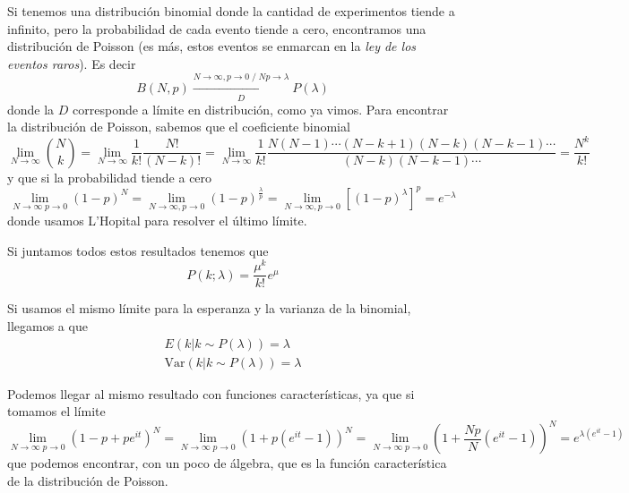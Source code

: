\documentclass{article}
\numberwithin{equation}{section} %
\begin{document}
Si tenemos una distribución binomial donde la cantidad de experimentos tiende a infinito, pero la probabilidad de cada evento tiende a cero, encontramos una distribución de Poisson (es más, estos eventos se enmarcan en la \emph{ley de los eventos raros}). Es decir
\begin{equation}
B(N, p) \xrightarrow[D]{N \to \infty, p \to 0 \; / \; N p \to \lambda} P(\lambda)
\end{equation}
donde la $D$ corresponde a límite en distribución, como ya vimos. Para encontrar la distribución de Poisson, sabemos que el coeficiente binomial
\begin{equation}
\lim_{N\to\infty} \binom{N}{k} = \lim_{N\to\infty} \frac{1}{k!} \frac{N!}{(N - k)!} = \lim_{N\to\infty} \frac{1}{k!} \frac{N (N - 1) \cdots (N - k + 1) (N - k) (N - k - 1) \cdots}{(N - k) (N - k - 1) \cdots } = \frac{N^k}{k!}
\end{equation}
y que si la probabilidad tiende a cero
\begin{equation}
\lim_{N\to\infty\;p \to 0} (1 - p)^{N} = \lim_{N\to\infty, p \to 0} (1 - p)^{\frac{\lambda}{p}} = \lim_{N\to\infty, p \to 0} \left[(1 - p)^{\lambda}\right]^{p} = e^{-\lambda}
\end{equation}
donde usamos L'Hopital para resolver el último límite.

Si juntamos todos estos resultados tenemos que
\begin{equation}
P(k;\lambda) = \frac{\mu^{k}}{k!} e^{\mu}
\end{equation}

Si usamos el mismo límite para la esperanza y la varianza de la binomial, llegamos a que
\begin{equation}
\begin{gathered}
E(k|k \sim P(\lambda)) = \lambda \\
\text{Var}(k|k\sim P(\lambda)) = \lambda
\end{gathered}
\end{equation}

Podemos llegar al mismo resultado con funciones características, ya que si tomamos el límite
\begin{equation}
\lim_{N\to\infty\;p\to 0} (1 - p + p e^{it})^N = \lim_{N\to\infty\;p\to 0} (1 + p ( e^{it} - 1))^N = \lim_{N\to\infty\;p\to 0} \left(1 + \frac{N p}{N} (e^{it} - 1 )\right)^N = e^{\lambda (e^{it} - 1)}
\end{equation} 
que podemos encontrar, con un poco de álgebra, que es la función característica de la distribución de Poisson.
\end{document}
